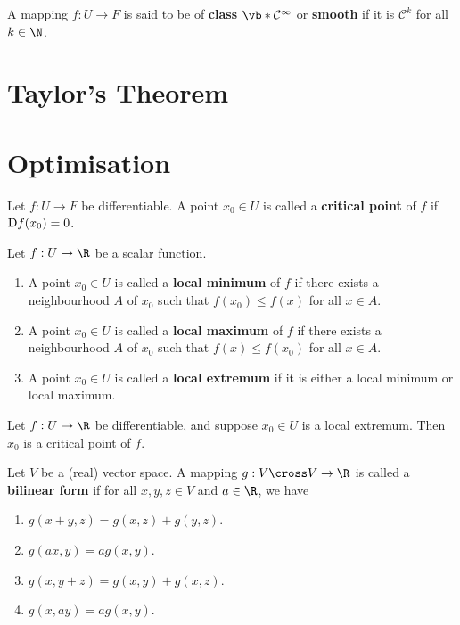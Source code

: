 \begin{definition}
  A mapping \( f:U\to F \) is said to be of \textbf{class \(\vb*{\mathcal{C}^\infty}\)} or \textbf{smooth} if it is \( \mathcal{C}^k \) for all \( k\in\N \).
\end{definition}
\section{Taylor's Theorem}
\section{Optimisation}
\begin{definition}
  Let \( f:U\to F \) be differentiable. A point \( x_0\in U \) is called a \textbf{critical point} of \( f \) if \( \text{D} f(x_0)=0 \).
\end{definition}

\begin{definition}
  Let \( f:U\to\R \) be a scalar function.
  \begin{enumerate}[label=(\alph*)]
  \item A point \( x_0\in U \) is called a \textbf{local minimum} of \( f \) if there exists a neighbourhood \( A \) of \( x_0 \) such that \( f(x_0)\leq f(x) \) for all \( x\in A \).
  \item A point \( x_0\in U \) is called a \textbf{local maximum} of \( f \) if there exists a neighbourhood \( A \) of \( x_0 \) such that \( f(x)\leq f(x_0) \) for all \( x\in A \).
  \item A point \( x_0\in U\) is called a \textbf{local extremum} if it is either a local minimum or local maximum.
  \end{enumerate}
\end{definition}

\begin{theorem}
  Let \( f:U\to\R \) be differentiable, and suppose \( x_0\in U \) is a local extremum. Then \( x_0 \) is a critical point of \( f \).
\end{theorem}

\begin{definition}
  Let \( V \) be a (real) vector space. A mapping \( g:V\cross V\to\R \) is called a \textbf{bilinear form} if for all \( x,y,z\in V \) and \( a\in\R \), we have
  \begin{enumerate}[label=(\alph*)]
  \item \( g(x+y,z)=g(x,z)+g(y,z) \).
  \item \( g(ax,y)=ag(x,y) \).
  \item \( g(x,y+z)=g(x,y)+g(x,z) \).
  \item \( g(x,ay)=ag(x,y) \).
  \end{enumerate}
\end{definition}

